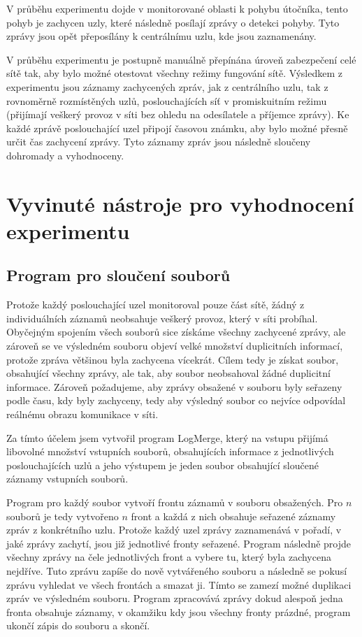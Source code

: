 \documentclass[11pt,final,twoside]{fithesis2}
\begin{document}
V průběhu experimentu dojde v monitorované oblasti k pohybu útočníka, tento pohyb je zachycen uzly, které následně posílají zprávy
o detekci pohyby. Tyto zprávy jsou opět přeposílány k centrálnímu uzlu, kde jsou zaznamenány.  

V průběhu experimentu je postupně manuálně přepínána úroveň zabezpečení celé sítě tak, aby bylo možné otestovat všechny režimy fungování 
sítě. Výsledkem z experimentu jsou záznamy zachycených zpráv, jak z centrálního uzlu, tak z rovnoměrně rozmístěných uzlů, poslouchajících 
síť v promiskuitním režimu (přijímají veškerý provoz v síti bez ohledu na odesílatele a příjemce zprávy). Ke každé zprávě poslouchající 
uzel připojí časovou známku, aby bylo možné přesně určit čas zachycení zprávy.  Tyto záznamy zpráv jsou následně sloučeny dohromady a 
vyhodnoceny.


\section{Vyvinuté nástroje pro vyhodnocení experimentu}
\subsection{Program pro sloučení souborů}
Protože každý poslouchající uzel monitoroval pouze část sítě, žádný z individuálních záznamů neobsahuje veškerý provoz, který v síti 
probíhal. Obyčejným spojením všech souborů sice získáme všechny zachycené zprávy, ale zároveň se ve výsledném souboru objeví velké 
množství duplicitních informací, protože zpráva většinou byla zachycena vícekrát. Cílem tedy je získat soubor, obsahující všechny zprávy, 
ale tak, aby soubor neobsahoval žádné duplicitní informace. Zároveň požadujeme, aby zprávy obsažené v souboru byly seřazeny podle času, 
kdy byly zachyceny, tedy aby výsledný soubor co nejvíce odpovídal reálnému obrazu komunikace v síti. 

Za tímto účelem jsem vytvořil program LogMerge, který na vstupu přijímá libovolné množství vstupních souborů, obsahujících informace z 
jednotlivých poslouchajících uzlů a jeho výstupem je jeden soubor obsahující sloučené záznamy vstupních souborů. 

Program pro každý soubor vytvoří frontu záznamů v souboru obsažených. Pro $n$ souborů je tedy vytvořeno $n$ front a každá z nich obsahuje 
seřazené záznamy zpráv z konkrétního uzlu. Protože každý uzel zprávy zaznamenává v pořadí, v jaké zprávy zachytí, jsou již jednotlivé 
fronty seřazené. Program následně projde všechny zprávy na čele jednotlivých front a vybere tu, který byla zachycena nejdříve. Tuto 
zprávu zapíše do nově vytvářeného souboru a následně se pokusí zprávu vyhledat ve všech frontách a smazat ji. Tímto se zamezí možné 
duplikaci zpráv ve výsledném souboru. Program zpracovává zprávy dokud alespoň jedna fronta obsahuje záznamy, v okamžiku kdy jsou všechny 
fronty prázdné, program ukončí zápis do souboru a skončí. 
\end{document}
